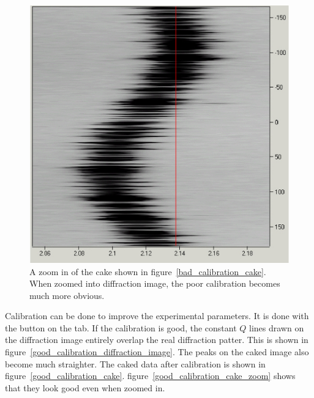 \begin{figure}
    \centering
    \includegraphics[scale=.75]
    {figures/bad_calibration_cake_zoom.eps}
    \caption{A zoom in of the cake shown in 
    figure~\ref{bad_calibration_cake}. When zoomed into 
    diffraction image, the poor calibration becomes much 
    more obvious.}
    \label{bad_calibration_cake_zoom}
\end{figure}

Calibration can be done to improve the experimental
parameters. It is done with the  button 
on the  tab. If the calibration is good, 
the constant $Q$ lines drawn on the diffraction image 
entirely overlap the real diffraction patter. 
This is shown in figure~\ref{good_calibration_diffraction_image}.
The peaks on the caked image also become much straighter.
The caked data after calibration is shown in 
figure~\ref{good_calibration_cake}.
figure~\ref{good_calibration_cake_zoom} shows that they
look good even when zoomed in.


